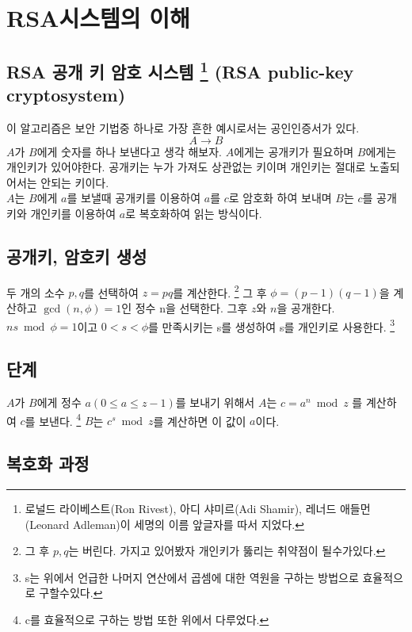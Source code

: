

\section{RSA시스템의 이해}

\subsection{RSA 공개 키 암호 시스템 
\protect\footnote{로널드 라이베스트(Ron Rivest), 아디 샤미르(Adi Shamir), 레너드 애들먼(Leonard Adleman)이 세명의 이름 앞글자를 따서 지었다.}
(RSA public-key cryptosystem)}

이 알고리즘은 보안 기법중 하나로 가장 흔한 예시로서는 공인인증서가 있다.
    \[A \longrightarrow B\]
$A$가 $B$에게 숫자를 하나 보낸다고 생각 해보자. $A$에게는 공개키가 필요하며 $B$에게는 개인키가 있어야한다. 공개키는 누가 가져도 상관없는 키이며 개인키는 절대로 노출되어서는 안되는 키이다.\\
$A$는 $B$에게 $a$를 보낼때 공개키를 이용하여 $a$를 $c$로 암호화 하여 보내며 $B$는 $c$를 공개키와 개인키를 이용하여 $a$로 복호화하여 읽는 방식이다.



\subsection{공개키, 암호키 생성}
두 개의 소수 $p,q$를 선택하여 $z=pq$를 계산한다.
\footnote{그 후 $p ,q$는 버린다. 가지고 있어봤자 개인키가 뚫리는 취약점이 될수가있다.}
 그 후 $\phi =(p-1)(q-1)$을 계산하고 $\gcd(n,\phi)=1$인 정수 n을 선택한다. 그후 $z$와 $n$을 공개한다.
  $ns\bmod \phi =1$이고 $0<s<\phi$를 만족시키는 s를 생성하여 s를 개인키로 사용한다.
\footnote{s는 위에서 언급한 나머지 연산에서 곱셈에 대한 역원을 구하는 방법으로 효율적으로  구할수있다.}\\


\subsection{단계}
$A$가 $B$에게 정수 $a(0\le a\le z-1)$를 보내기 위해서 $A$는 $c=a^n \bmod z$ 를 계산하여 $c$를 보낸다.
\footnote{c를 효율적으로 구하는 방법 또한 위에서 다루었다.}
$B$는 $c^s \bmod z$를 계산하면 이 값이 $a$이다.\\





\subsection{복호화 과정}


